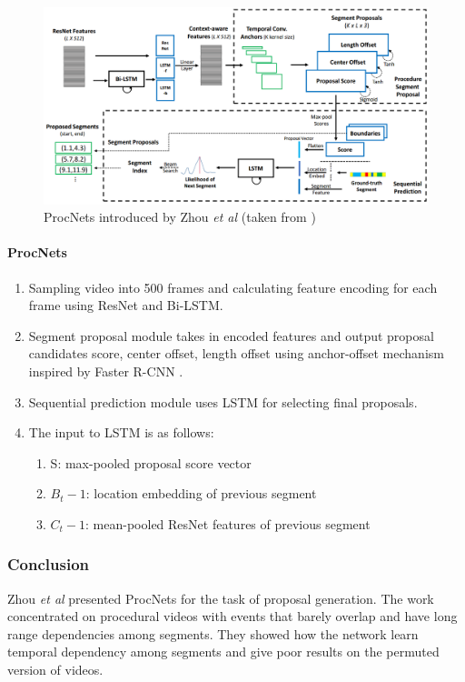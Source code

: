 \begin{figure}[h]
	\includegraphics[width=\linewidth]{assets/img/zhou2017automatic-architecture.png}
	\caption{ProcNets introduced by Zhou \textit{et al} (taken from \cite{zhou2017automatic})}
\end{figure}

\paragraph{ProcNets}
\begin{enumerate}
	\item Sampling video into 500 frames and calculating feature encoding for each frame using ResNet \cite{he2015deep} and Bi-LSTM.
	\item Segment proposal module takes in encoded features and output proposal candidates {score, center offset, length offset} using anchor-offset mechanism inspired by Faster R-CNN \cite{ren2016faster}.
	\item Sequential prediction module uses LSTM for selecting final proposals.
	\item The input to LSTM is as follows:
	\begin{enumerate}
		\item S: max-pooled proposal score vector
		\item $B_t-1$: location embedding of previous segment
		\item $C_t-1$: mean-pooled ResNet features of previous segment 
	\end{enumerate}
\end{enumerate}


\subsubsection{Conclusion}

\par Zhou \textit{et al} presented ProcNets for the task of proposal generation. The work concentrated on procedural videos with events that barely overlap and have long range dependencies among segments. They showed how the network learn temporal dependency among segments and give poor results on the permuted version of videos.